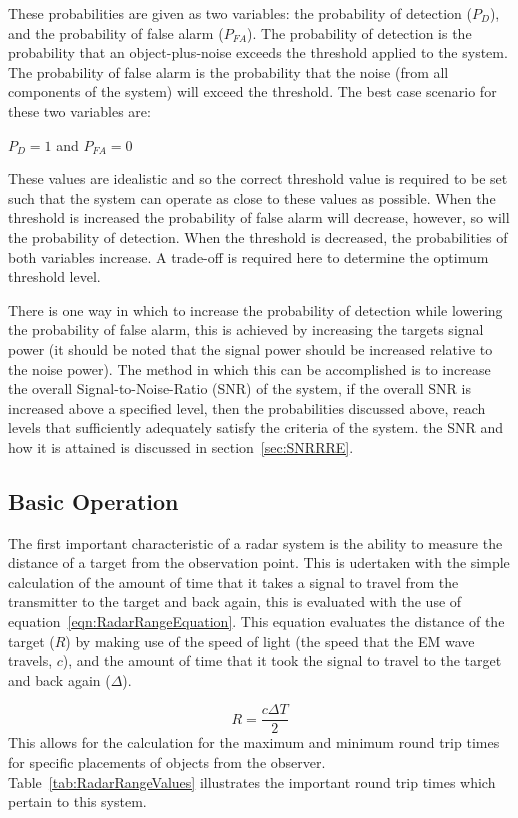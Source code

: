 \documentclass[11pt]{witseiepaper}
\begin{document}
These probabilities are given as two variables: the probability of detection ($P_{D}$), and the probability of false alarm ($P_{FA}$). The probability of detection is the probability that an object-plus-noise exceeds the threshold applied to the system. The probability of false alarm is the probability that the noise (from all components of the system) will exceed the threshold.
The best case scenario for these two variables are: 


$P_{D} = 1$ and $P_{FA} = 0$

These values are idealistic and so the correct threshold value is required to be set such that the system can operate as close to these values as possible.
When the threshold is increased the probability of false alarm will decrease, however, so will the probability of detection. When the threshold is decreased, the probabilities of both variables increase. A trade-off is required here to determine the optimum threshold level.

There is one way in which to increase the probability of detection while lowering the probability of false alarm, this is achieved by increasing the targets signal power (it should be noted that the signal power should be increased relative to the noise power). The method in which this can be accomplished is to increase the overall Signal-to-Noise-Ratio (SNR) of the system, if the overall SNR is increased above a specified level, then the probabilities discussed above, reach levels that sufficiently adequately satisfy the criteria of the system. the SNR and how it is attained is discussed in section~\ref{sec:SNRRRE}. 


\subsection{Basic Operation} \label{sec:BasicOperation}
The first important characteristic of a radar system is the ability to measure the distance of a target from the observation point. This is udertaken with the simple calculation of the amount of time that it takes a signal to travel from the transmitter to the target and back again, this is evaluated with the use of equation~\ref{eqn:RadarRangeEquation}. This equation evaluates the distance of the target ($R$) by making use of the speed of light (the speed that the EM wave travels, $c$), and the amount of time that it took the signal to travel to the target and back again ($\Delta$).

\begin{equation} \label{eqn:RadarRangeEquation}
    R = \frac{c \Delta T}{2}
\end{equation}
This allows for the calculation for the maximum and minimum round trip times for specific placements of objects from the observer. Table~\ref{tab:RadarRangeValues} illustrates the important round trip times which pertain to this system.
\end{document}

